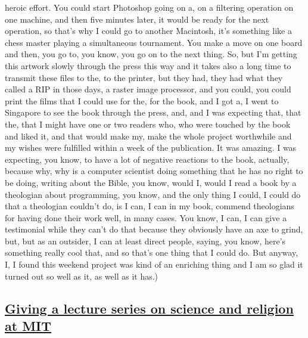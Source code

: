 \documentclass[]{article}
\begin{document}
heroic effort. You could start Photoshop going on a, on a filtering
operation on one machine, and then five minutes later, it would be ready
for the next operation, so that's why I could go to another Macintosh,
it's something like a chess master playing a simultaneous tournament.
You make a move on one board and then, you go to, you know, you go on to
the next thing. So, but I'm getting this artwork slowly through the
press this way and it takes also a long time to transmit these files to
the, to the printer, but they had, they had what they called a RIP in
those days, a raster image processor, and you could, you could print the
films that I could use for the, for the book, and I got a, I went to
Singapore to see the book through the press, and, and I was expecting
that, that the, that I might have one or two readers who, who were
touched by the book and liked it, and that would make my, make the whole
project worthwhile and my wishes were fulfilled within a week of the
publication. It was amazing. I was expecting, you know, to have a lot of
negative reactions to the book, actually, because why, why is a computer
scientist doing something that he has no right to be doing, writing
about the Bible, you know, would I, would I read a book by a theologian
about programming, you know, and the only thing I could, I could do that
a theologian couldn't do, is I can, I can in my book, commend
theologians for having done their work well, in many cases. You know, I
can, I can give a testimonial while they can't do that because they
obviously have an axe to grind, but, but as an outsider, I can at least
direct people, saying, you know, here's something really cool that, and
so that's one thing that I could do. But anyway, I, I found this weekend
project was kind of an enriching thing and I am so glad it turned out so
well as it, as well as it has.)

\subsection{\texorpdfstring{\href{http://webofstories.com/play/17134}{Giving
a lecture series on science and religion at
MIT}}{Giving a lecture series on science and religion at MIT}}\label{giving-a-lecture-series-on-science-and-religion-at-mit}
\end{document}

